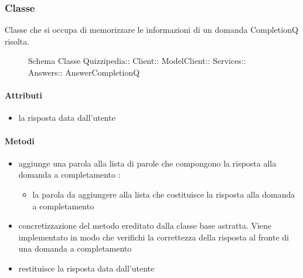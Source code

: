 \subsubsection{Classe }
Classe che si occupa di memorizzare le informazioni di un domanda CompletionQ risolta.
\begin{figure}[H]
\centering
\noindent{}
\caption[Schema Classe AnswerCompletionQ]{Schema Classe Quizzipedia:: Client:: ModelClient:: Services:: Answers:: AnswerCompletionQ}
\end{figure}
\paragraph{Attributi}
\begin{itemize}
\item {}
\newline
la risposta data dall'utente
\end{itemize}
\paragraph{Metodi}
\begin{itemize}
\item {}
\newline
aggiunge una parola alla lista di parole che compongono la risposta alla domanda a completamento
\newline
{} :
\begin{itemize}
\item {}
\newline
la parola da aggiungere alla lista che costituisce la risposta alla domanda a completamento
\end{itemize}
\item {}
\newline
concretizzazione del metodo ereditato dalla classe base astratta. Viene implementato in modo che verifichi la correttezza della risposta al fronte di una domanda a completamento
\newline
\item {}
\newline
restituisce la risposta data dall'utente
\newline
\end{itemize}
